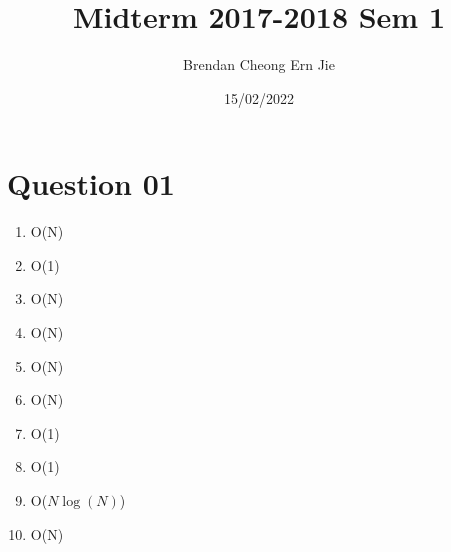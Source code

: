 \documentclass{article}
\title{Midterm 2017-2018 Sem 1}
\author{Brendan Cheong Ern Jie}
\date {15/02/2022}
\begin{document}
\maketitle

\section{Question 01}
\begin{enumerate}[label=(\arabic*)]

\item O(N)

\item O(1)

\item O(N)

\item O(N)

\item O(N)

\item O(N)

\item O(1)

\item O(1)

\item O($N\log(N)$)

\item O(N)

\end{enumerate}
\end{document}

